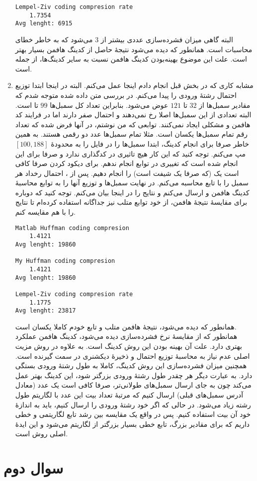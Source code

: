 \documentclass[a4paper]{article}
\begin{document}
\begin{enumerate}[1)]
\begin{latin}
\begin{Verbatim}[frame=single,
				baselinestretch=1.2,
				xleftmargin=1.5cm,
				xrightmargin=1.5cm,
				breaklines=true]
Lempel-Ziv coding compresion rate
    1.7354
Avg lenght: 6915
\end{Verbatim}
\end{latin}
البته گاهی میزان فشرده‌سازی عددی بیشتر از 
$3$
می‌شود که به خاطر خطای محاسبات است. همانطور که دیده می‌شود نتیجۀ حاصل از کدینگ هافمن بسیار بهتر است. علت این موضوع بهینه‌بودن کدینگ هافمن نسبت به سایر کدینگ‌ها، از جمله 
است.
\item مشابه کاری که در بخش قبل انجام دادم اینجا عمل می‌کنم. البته در اینجا ابتدا توزیع احتمال رشتۀ ورودی را پیدا می‌کنم. در بررسی متن داده شده متوجه شدم که مقادیر سمبل‌ها از 
$32$
تا
$121$
عوض می‌شود. بنابراین تعداد کل سمبل‌ها 
$99$
تا است. البته تعدادی از این سمبل‌ها اصلا رخ نمی‌دهند و احتمال صفر دارند اما در فرایند کد هافمن و 
مشکلی ایجاد نمی‌کنند. توابعی که من نوشتم، در آنها فرض شده که تعداد رقم تمام سمبل‌ها یکسان است. مثلا تمام سمبل‌ها عدد دو رقمی هستند. به همین خاطر صرفا برای انجام کدینگ، ابتدا سمبل‌ها را در فایل 
را به محدودۀ 
$[100, 188]$
مپ می‌کنم. توجه کنید که این کار هیچ تاثیری در کدگذاری ندارد و صرفا برای این انجام شده است که تغییری در توابع انجام ندهم. برای دیکود کردن صرفا کافی است یک 
(که صرفا یک شیفت است) را انجام دهیم. پس از 
، 
احتمال رخداد هر سمبل را با تابع 
محاسبه می‌کنم. در نهایت سمبل‌ها و توزیع آنها را به توابع محاسبۀ کدینگ هافمن و 
ارسال می‌کنم و نتایج را در اینجا بیان می‌کنم. توجه کنید که دوباره برای مقایسۀ نتیجۀ هافمن، از خود توابع متلب نیز جداگانه استفاده کرده‌ام تا نتایج را با هم مقایسه کنم.
\begin{latin}
\begin{Verbatim}[frame=single,
				baselinestretch=1.2,
				xleftmargin=1.5cm,
				xrightmargin=1.5cm,
				breaklines=true]
Matlab Huffman coding compresion
    1.4121
Avg lenght: 19860

My Huffman coding compresion
    1.4121
Avg lenght: 19860

Lempel-Ziv coding compresion rate
    1.1775
Avg lenght: 23817
\end{Verbatim}
\end{latin}
همانطور که دیده می‌شود، نتیجۀ هافمن متلب و تابع خودم کاملا یکسان است. \\
همانطور که از مقایسۀ نرخ فشرده‌سازی دیده می‌شود، کدینگ هافمن عملکرد بهتری دارد. علت آن بهینه بودن این روش کدینگ است. به علاوه در روش 
مزیت اصلی عدم نیاز به محاسبۀ توزیع احتمال و ذخیرۀ دیکشنری در سمت گیرنده است. همچنین میزان فشرده‌سازی این روش کدینگ، کاملا به طول رشتۀ ورودی بستگی دارد. به عبارت دیگر هر چقدر طول رشتۀ ورودی بزرگتر شود، این کدینگ بهتر عمل می‌کند چون به جای ارسال سمبل‌های طولانی‌تر، صرفا کافی است یک عدد (معادل آدرس سمبل‌های قبلی) ارسال کنیم که مرتبۀ تعداد بیت این عدد با لگاریتم طول رشته زیاد می‌شود. در حالی که اگر خود رشتۀ ورودی را ارسال کنیم، باید به اندازۀ خود آن بیت استفاده کنیم. پس در واقع یک مقایسه بین رشد تابع لگاریتمی و خطی داریم که برای مقادیر بزرگ، تابع خطی بسیار بزرگتر از لگاریتم می‌شود و این ایدۀ اصلی روش 
است.
\end{enumerate}
\section{سوال دوم}
\end{document}
